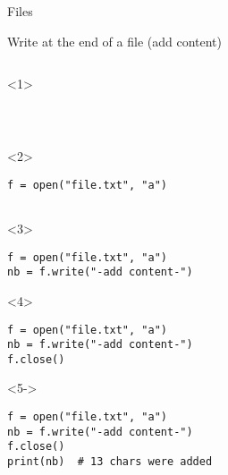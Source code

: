 \begin{frame}[fragile]{Files}

  Write at the end of a file (add content)

  \begin{columns}[onlytextwidth]
    \begin{column}{\textwidth}

      \begin{onlyenv}<1>
        \begin{lstlisting}[style=python]



 \end{lstlisting}
      \end{onlyenv}

      \begin{onlyenv}<2>
        \begin{lstlisting}[style=python]
f = open("file.txt", "a")


 \end{lstlisting}
      \end{onlyenv}

      \begin{onlyenv}<3>
        \begin{lstlisting}[style=python]
f = open("file.txt", "a")
nb = f.write("-add content-")

 \end{lstlisting}
      \end{onlyenv}

      \begin{onlyenv}<4>
        \begin{lstlisting}[style=python]
f = open("file.txt", "a")
nb = f.write("-add content-")
f.close()
 \end{lstlisting}
      \end{onlyenv}

      \begin{onlyenv}<5->
        \begin{lstlisting}[style=python]
f = open("file.txt", "a")
nb = f.write("-add content-")
f.close()
print(nb)  # 13 chars were added \end{lstlisting}
      \end{onlyenv}

    \end{column}
  \end{columns}

\end{frame}


